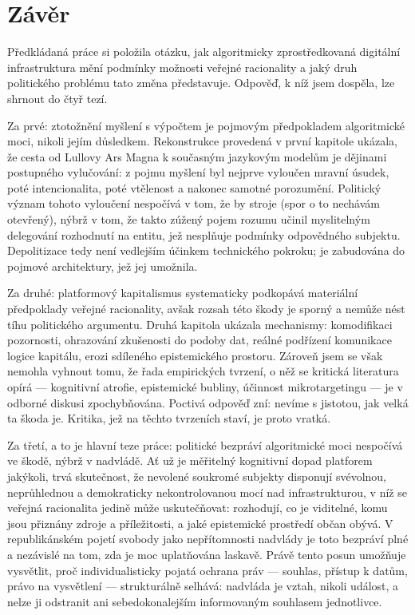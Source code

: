 \chapter*{Závěr}

Předkládaná práce si položila otázku, jak algoritmicky zprostředkovaná digitální infrastruktura mění podmínky možnosti veřejné racionality a jaký druh politického problému tato změna představuje.
Odpověď, k níž jsem dospěla, lze shrnout do čtyř tezí.


Za prvé: ztotožnění myšlení s výpočtem je pojmovým předpokladem algoritmické moci, nikoli jejím důsledkem. Rekonstrukce provedená v první kapitole ukázala, že cesta od Lullovy Ars Magna k současným jazykovým modelům je dějinami postupného vylučování: z pojmu myšlení byl nejprve vyloučen mravní úsudek, poté intencionalita, poté vtělenost a nakonec samotné porozumění.
Politický význam tohoto vyloučení nespočívá v tom, že by stroje  (spor o to nechávám otevřený), nýbrž v tom, že takto zúžený pojem rozumu učinil myslitelným delegování rozhodnutí na entitu, jež nesplňuje podmínky odpovědného subjektu.
Depolitizace tedy není vedlejším účinkem technického pokroku; je zabudována do pojmové architektury, jež jej umožnila.


Za druhé: platformový kapitalismus systematicky podkopává materiální předpoklady veřejné racionality, avšak rozsah této škody je sporný a nemůže nést tíhu politického argumentu.
Druhá kapitola ukázala mechanismy: komodifikaci pozornosti, ohrazování zkušenosti do podoby dat, reálné podřízení komunikace logice kapitálu, erozi sdíleného epistemického prostoru.
Zároveň jsem se však nemohla vyhnout tomu, že řada empirických tvrzení, o něž se kritická literatura opírá — kognitivní atrofie, epistemické bubliny, účinnost mikrotargetingu — je v odborné diskusi zpochybňována.
Poctivá odpověď zní: nevíme s jistotou, jak velká ta škoda je.
Kritika, jež na těchto tvrzeních staví, je proto vratká.


Za třetí, a to je hlavní teze práce: politické bezpráví algoritmické moci nespočívá ve škodě, nýbrž v nadvládě.
Ať už je měřitelný kognitivní dopad platforem jakýkoli, trvá skutečnost, že nevolené soukromé subjekty disponují svévolnou, neprůhlednou a demokraticky nekontrolovanou mocí nad infrastrukturou, v níž se veřejná racionalita jedině může uskutečňovat: rozhodují, co je viditelné, komu jsou přiznány zdroje a příležitosti, a jaké epistemické prostředí občan obývá.
V republikánském pojetí svobody jako nepřítomnosti nadvlády je toto bezpráví plné a nezávislé na tom, zda je moc uplatňována laskavě.
Právě tento posun umožňuje vysvětlit, proč individualisticky pojatá ochrana práv — souhlas, přístup k datům, právo na vysvětlení — strukturálně selhává: nadvláda je vztah, nikoli událost, a nelze ji odstranit ani sebedokonalejším informovaným souhlasem jednotlivce.


